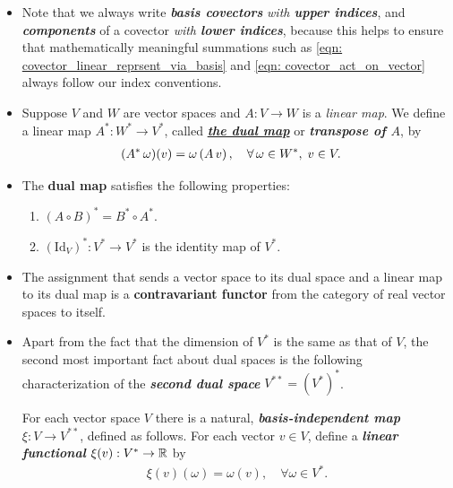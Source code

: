 \documentclass[11pt]{article}
\begin{document}
\begin{itemize}
\item Note that we always write \emph{\textbf{basis covectors}} \emph{with \textbf{upper indices}}, and \emph{\textbf{components}} of a covector \emph{with \textbf{lower indices}}, because this helps to ensure that mathematically meaningful summations such as \eqref{eqn: covector_linear_reprsent_via_basis} and \eqref{eqn: covector_act_on_vector} always follow our index conventions.

\item 
\begin{definition}
Suppose $V$ and $W$ are vector spaces and $A: V \rightarrow W$ is a \emph{linear map}. We define a linear map $A^{*}: W^{*} \rightarrow V^{*}$, called \underline{\emph{\textbf{the dual map}}} or \textbf{\emph{transpose of $A$}}, by
\begin{align}
(A^{*}\,\omega)(v) &= \omega\left(A\,v\right), \quad \forall\, \omega \in W^{*}, \; v \in V. \label{eqn: dual_map}
\end{align}
\end{definition}

\item 
\begin{proposition}
The \textbf{dual map} satisfies the following properties:
\begin{enumerate}
\item  $(A \circ B)^{*} = B^{*} \circ A^{*}$.
\item  $(\text{Id}_{V})^{*}: V^{*} \rightarrow V^{*}$ is the identity map of $V^{*}$.
\end{enumerate}
\end{proposition}

\item \begin{corollary}
The assignment that sends a vector space to its dual space and a linear map to its dual map is a \textbf{contravariant functor} from the category of real vector spaces to itself.
\end{corollary}

\item \begin{definition}
Apart from the fact that the dimension of $V^{*}$ is the same as that of $V$, the second most important fact about dual spaces is the following characterization of the \emph{\textbf{second dual space}} $V^{**} = (V^{*})^{*}$.

For each vector space $V$ there is a natural, \emph{\textbf{basis-independent map}} $\xi: V \rightarrow V^{**}$, defined as follows. For each vector $v \in V$, define a \emph{\textbf{linear functional}} $\xi(v): V^{*} \rightarrow {\mathbb R}$ by
\begin{align}
\xi(v)(\omega) = \omega(v), \quad \forall \omega \in V^{*}. \label{eqn: double_dual_vector}
\end{align}
\end{definition}


\end{itemize}
\end{document}
